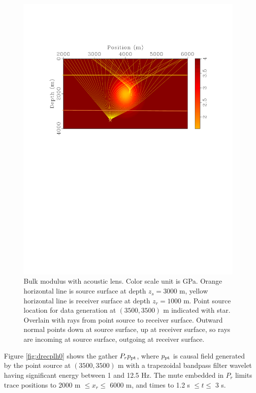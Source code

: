 \documentclass[georeport,12pt]{geophysics}
\begin{document}
\begin{figure}
  \includegraphics[width=\textwidth]{olensrays0.pdf}
  \caption{Bulk modulus with acoustic lens. Color scale unit is
    GPa. Orange horizontal line is source surface at depth $z_s= 3000$
    m, yellow horizontal
    line is receiver surface at depth $z_r=1000$ m. Point source location for data
    generation at $(3500, 3500)$ m indicated with star. Overlain with rays from point
    source to receiver surface. Outward normal points down at source
    surface, up at receiver surface, so rays are incoming at source
    surface, outgoing at receiver surface.}
  \label{fig:olensrays0}
\end{figure}

Figure \ref{fig:drecplh0} shows the gather $P_rp_{\rm pt}$, where
$p_{\rm pt}$ is causal field generated by the point source at
$(3500,3500)$ m with a trapezoidal bandpass filter wavelet having
significant energy between 1 and 12.5 Hz. The mute embedded in $P_r$
limits trace positions to 2000 m $ \le x_r \le $ 6000 m, and times to
1.2 s $ \le t \le $ 3 s.
\end{document}
